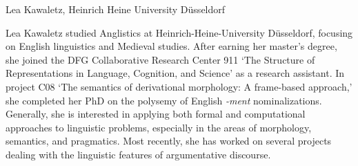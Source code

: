 Lea Kawaletz, Heinrich Heine University Düsseldorf

Lea Kawaletz studied Anglistics at Heinrich-Heine-University Düsseldorf, focusing on English linguistics and Medieval studies. After earning her master's degree, she joined the DFG Collaborative Research Center 911 `The Structure of Representations in Language, Cognition, and Science' as a research assistant. In project C08 `The semantics of derivational morphology: A frame-based approach,' she completed her PhD on the polysemy of English \textit{-ment} nominalizations. Generally, she is interested in applying both formal and computational approaches to linguistic problems, especially in the areas of morphology, semantics, and pragmatics. Most recently, she has worked on several projects dealing with the linguistic features of argumentative discourse.